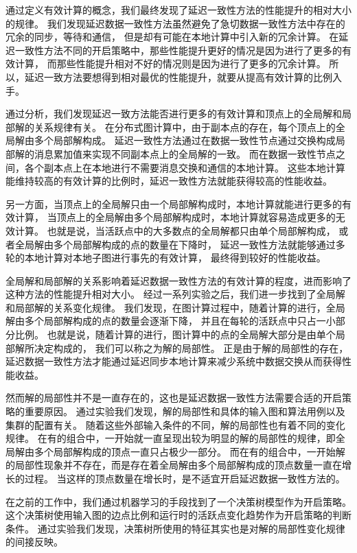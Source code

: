 通过定义有效计算的概念，我们最终发现了延迟一致性方法的性能提升的相对大小的规律。
我们发现延迟数据一致性方法虽然避免了急切数据一致性方法中存在的冗余的同步，等待和通信，
但是却有可能在本地计算中引入新的冗余计算。
在延迟一致性方法不同的开启策略中，那些性能提升更好的情况是因为进行了更多的有效计算，
而那些性能提升相对不好的情况则是因为进行了更多的冗余计算。
所以，延迟一致方法要想得到相对最优的性能提升，就要从提高有效计算的比例入手。

通过分析，我们发现延迟一致方法能否进行更多的有效计算和顶点上的全局解和局部解的关系规律有关。
在分布式图计算中，由于副本点的存在，每个顶点上的全局解由多个局部解构成。
延迟一致性方法通过在数据一致性节点通过交换构成局部解的消息累加值来实现不同副本点上的全局解的一致。
而在数据一致性节点之间，各个副本点上在本地进行不需要消息交换和通信的本地计算。
这些本地计算能维持较高的有效计算的比例时，延迟一致性方法就能获得较高的性能收益。

另一方面，当顶点上的全局解只由一个局部解构成时，本地计算就能进行更多的有效计算，
当顶点上的全局解由多个局部解构成时，本地计算就容易造成更多的无效计算。
也就是说，当活跃点中的大多数点的全局解都只由单个局部解构成，
或者全局解由多个局部解构成的点的数量在下降时，
延迟一致性方法就能够通过多轮的本地计算对本地子图进行事先的有效计算，
最终得到较好的性能收益。


全局解和局部解的关系影响着延迟数据一致性方法的有效计算的程度，进而影响了这种方法的性能提升相对大小。
经过一系列实验之后，我们进一步找到了全局解和局部解的关系变化规律。
我们发现，在图计算过程中，随着计算的进行，全局解由多个局部解构成的点的数量会逐渐下降，
并且在每轮的活跃点中只占一小部分比例。
也就是说，随着计算的进行，图计算中的点的全局解大部分是由单个局部解所决定构成的，
我们可以称之为解的局部性。
正是由于解的局部性的存在，延迟数据一致性方法才能通过延迟同步本地计算来减少系统中数据交换从而获得性能收益。

然而解的局部性并不是一直存在的，这也是延迟数据一致性方法需要合适的开启策略的重要原因。
通过实验我们发现，解的局部性和具体的输入图和算法用例以及集群的配置有关。
随着这些外部输入条件的不同，解的局部性也有着不同的变化规律。
在有的组合中，一开始就一直呈现出较为明显的解的局部性的规律，即全局解由多个局部解构成的顶点一直只占极少一部分。
而在有的组合中，一开始解的局部性现象并不存在，而是存在着全局解由多个局部解构成的顶点数量一直在增长的过程。
当这样的顶点数量在增长时，是不适宜开启延迟数据一致性方法的。

在之前的工作中，我们通过机器学习的手段找到了一个决策树模型作为开启策略。
这个决策树使用输入图的边点比例和运行时的活跃点变化趋势作为开启策略的判断条件。
通过实验我们发现，决策树所使用的特征其实也是对解的局部性变化规律的间接反映。

